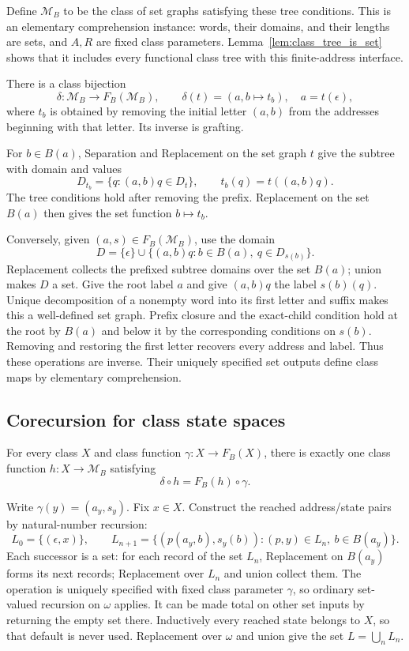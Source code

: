 Define $\mathcal M_B$ to be the class of set graphs satisfying these
tree conditions. This is an elementary comprehension instance: words,
their domains, and their lengths are sets, and $A,R$ are fixed class
parameters. Lemma~\ref{lem:class_tree_is_set} shows that it includes
every functional class tree with this finite-address interface.

\begin{lemma}
\label{lem:class_tree_grafting}
There is a class bijection
\[
\delta:\mathcal M_B\longrightarrow F_B(\mathcal M_B),\qquad
\delta(t)=(a,b\mapsto t_b),\quad a=t(\epsilon),
\]
where $t_b$ is obtained by removing the initial letter $(a,b)$ from
the addresses beginning with that letter. Its inverse is grafting.
\end{lemma}
\Proof
For $b\in B(a)$, Separation and Replacement on the set graph $t$
give the subtree with domain and values
\[
D_{t_b}=\{q:(a,b)q\in D_t\},\qquad t_b(q)=t((a,b)q).
\]
The tree conditions hold after removing the prefix. Replacement on
the set $B(a)$ then gives the set function $b\mapsto t_b$.

Conversely, given $(a,s)\in F_B(\mathcal M_B)$, use the domain
\[
D=\{\epsilon\}\cup
\{(a,b)q:b\in B(a),\ q\in D_{s(b)}\}.
\]
Replacement collects the prefixed subtree domains over the set $B(a)$;
union makes $D$ a set. Give the root label $a$ and give $(a,b)q$
the label $s(b)(q)$. Unique decomposition of a nonempty word into its
first letter and suffix makes this a well-defined set graph. Prefix
closure and the exact-child condition hold at the root by $B(a)$ and
below it by the corresponding conditions on $s(b)$.
Removing and restoring the first letter recovers every address and
label. Thus these operations are inverse. Their uniquely specified
set outputs define class maps by elementary comprehension.
\Done

\subsection{Corecursion for class state spaces}
\begin{theorem}
\label{thm:class_M_final}
For every class $X$ and class function $\gamma:X\to F_B(X)$, there
is exactly one class function $h:X\to\mathcal M_B$ satisfying
\[
\delta\circ h=F_B(h)\circ\gamma.
\]
\end{theorem}
\Proof
Write $\gamma(y)=(a_y,s_y)$. Fix $x\in X$. Construct the reached
address/state pairs by natural-number recursion:
\[
L_0=\{(\epsilon,x)\},\qquad
L_{n+1}=\{(p(a_y,b),s_y(b)):(p,y)\in L_n,\ b\in B(a_y)\}.
\]
Each successor is a set: for each record of the set $L_n$, Replacement
on $B(a_y)$ forms its next records; Replacement over $L_n$ and union
collect them. The operation is uniquely specified with fixed class
parameter $\gamma$, so ordinary set-valued recursion on $\omega$
applies. It can be made total on other set inputs by returning the
empty set there. Inductively every reached state belongs to $X$, so
that default is never used. Replacement over $\omega$ and union give
the set $L=\bigcup_nL_n$.

